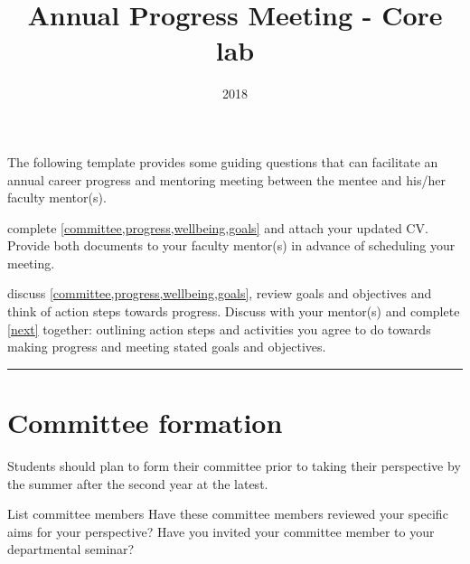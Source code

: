 \documentclass[answers,12pt]{exam}
\title{Annual Progress Meeting - Core lab}
\date{2018}
\begin{document}
\noindent
The following template provides some guiding questions that can facilitate an
annual career progress and mentoring meeting between the mentee and his/her
faculty mentor(s).

\begin{description}[leftmargin=0pt]
\item[Student / Postdoc:] complete \cref{committee,progress,wellbeing,goals} and
  attach your updated CV.  Provide both documents to your faculty mentor(s) in
  advance of scheduling your meeting.
\item[Student / Postdoc and Faculty Mentor(s):] discuss
  \cref{committee,progress,wellbeing,goals}, review goals and objectives and
  think of action steps towards progress.  Discuss with your mentor(s) and
  complete \cref{next} together: outlining action steps and activities you agree
  to do towards making progress and meeting stated goals and objectives.
\end{description}

\noindent\rule{\linewidth}{0.4pt}

\section{Committee formation}\label{committee}
Students should plan to form their committee prior to taking their perspective
by the summer after the second year at the latest.
\begin{questions}
\question
\filbreak List committee members \tbox{}
\question
\filbreak Have these committee members reviewed your specific aims for your
  perspective?  \tbox{}
\question
\filbreak Have you invited your committee member to your departmental seminar?
  \tbox{}
\end{questions}
\end{document}
